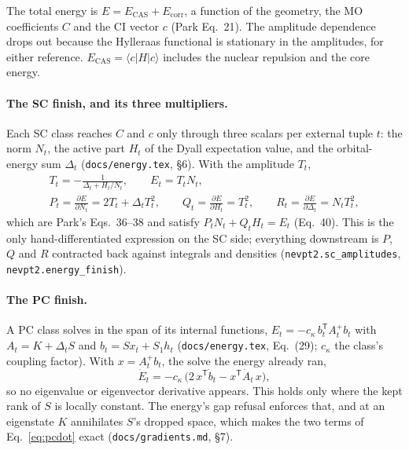\documentclass[11pt]{article}
\newcommand{\code}[1]{\texttt{#1}}
\newcommand{\Ecas}{E_{\mathrm{CAS}}}
\newcommand{\Ecorr}{E_{\mathrm{corr}}}
\begin{document}
The total energy is $E = \Ecas + \Ecorr$, a function of the geometry, the MO
coefficients $C$ and the CI vector $c$ (Park Eq.~21). The amplitude
dependence drops out because the Hylleraas functional is stationary in the
amplitudes, for either reference. $\Ecas = \langle c|H|c\rangle$ includes the
nuclear repulsion and the core energy.

\paragraph{The SC finish, and its three multipliers.} Each SC class reaches
$C$ and $c$ only through three scalars per external tuple $t$: the norm $N_t$,
the active part $H_t$ of the Dyall expectation value, and the orbital-energy
sum $\Delta_t$ (\code{docs/energy.tex}, \S6). With the amplitude $T_t$,
\begin{equation}
\begin{gathered}
  T_t = -\frac{1}{\Delta_t + H_t/N_t},\qquad E_t = T_t N_t,\\
  P_t = \frac{\partial E}{\partial N_t} = 2T_t + \Delta_t T_t^2,\qquad
  Q_t = \frac{\partial E}{\partial H_t} = T_t^2,\qquad
  R_t = \frac{\partial E}{\partial \Delta_t} = N_t T_t^2,
\end{gathered}
  \label{eq:pqr}
\end{equation}
which are Park's Eqs.~36--38 and satisfy $P_tN_t + Q_tH_t = E_t$ (Eq.~40).
This is the only hand-differentiated expression on the SC side; everything
downstream is $P$, $Q$ and $R$ contracted back against integrals and densities
(\code{nevpt2.sc\_amplitudes}, \code{nevpt2.energy\_finish}).

\paragraph{The PC finish.} A PC class solves in the span of its internal
functions, $E_t = -c_\kappa\,b_t^{\mathsf T} A_t^{+} b_t$ with $A_t = K + \Delta_t S$ and
$b_t = S x_t + S_1 h_t$ (\code{docs/energy.tex}, Eq.~(29); $c_\kappa$ the
class's coupling factor). With $x = A_t^{+} b_t$, the solve the energy
already ran,
\begin{equation}
  \dot E_t = -c_\kappa\,\bigl(2\,x^{\mathsf T}\dot b_t - x^{\mathsf T}\dot A_t\,x\bigr),
  \label{eq:pcdot}
\end{equation}
so no eigenvalue or eigenvector derivative appears. This holds only where the
kept rank of $S$ is locally constant. The energy's gap refusal enforces that,
and at an eigenstate $K$ annihilates $S$'s dropped space, which makes the two
terms of Eq.~\eqref{eq:pcdot} exact (\code{docs/gradients.md}, \S7).
\end{document}
